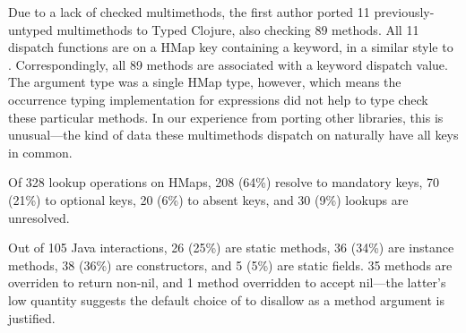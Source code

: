 %
Due to a lack of checked multimethods,
the first author ported 11 previously-untyped multimethods to Typed Clojure, also checking 
89 methods. All 11 dispatch functions
are on a HMap key containing a keyword, in a similar style to
.
Correspondingly, all 89 methods are associated with a keyword dispatch value.
The argument type was a single HMap type, however,
which means the occurrence typing implementation
for  expressions
did not help to type check these particular methods.
In our experience from porting other libraries, this is unusual---the
kind of data these multimethods dispatch on naturally have all keys in common.



Of 328 lookup operations on HMaps,
208 (64\%) resolve to mandatory keys,
70 (21\%) to optional keys,
20 (6\%) to absent keys, and
30 (9\%) lookups are unresolved.








Out of 105 Java interactions, 26 (25\%) are static methods, 36 (34\%)
are instance methods, 38 (36\%) are constructors, and 5 (5\%) are static
fields. 35 methods are overriden to return non-nil, and 1 method 
overridden to accept nil---the latter's low quantity suggests
the default choice of \coretyped{} to disallow  as a method argument
is justified.

